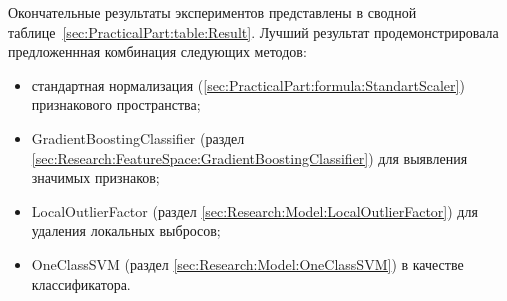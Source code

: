 \documentclass[12pt]{article}
\begin{document}
    \par Окончательные результаты экспериментов представлены в сводной таблице~\ref{sec:PracticalPart:table:Result}. Лучший результат продемонстрировала предложеннная комбинация следующих методов:

    \begin{itemize}
        \item стандартная нормализация (\ref{sec:PracticalPart:formula:StandartScaler}) признакового пространства;
        \item GradientBoostingClassifier (раздел \ref{sec:Research:FeatureSpace:GradientBoostingClassifier}) для выявления значимых признаков;
        \item LocalOutlierFactor (раздел \ref{sec:Research:Model:LocalOutlierFactor}) для удаления локальных выбросов;
        \item OneClassSVM (раздел \ref{sec:Research:Model:OneClassSVM}) в качестве классификатора.
    \end{itemize}
\end{document}
